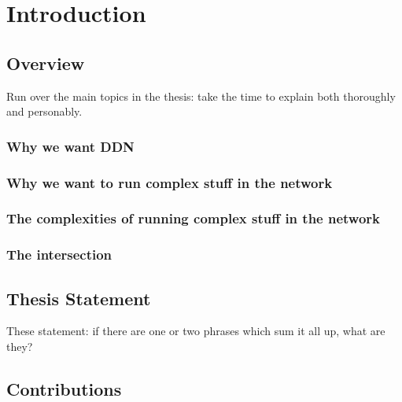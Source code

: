 \chapter{Introduction}


\section{Overview}

Run over the main topics in the thesis: take the time to explain both thoroughly and personably.

\subsection{Why we want DDN}

\subsection{Why we want to run complex stuff in the network}

\subsection{The complexities of running complex stuff in the network}

\subsection{The intersection}

\section{Thesis Statement}

These statement: if there are one or two phrases which sum it all up, what are they?

\section{Contributions}

